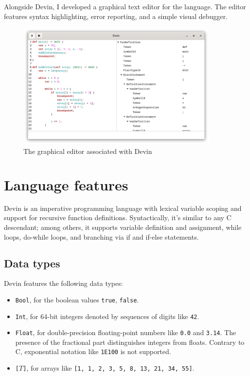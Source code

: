 \documentclass[UdineBachThesis,american,11pt]{PhdThesis}
\begin{document}
  Alongside Devin, I developed a graphical text editor for the language. The
  editor features syntax highlighting, error reporting, and a simple visual
  debugger.

  \begin{figure}[H]
    \centering
    \includegraphics[width=0.9\textwidth]{2.png}
    \caption{The graphical editor associated with Devin}
  \end{figure}

  \newpage

  \section{Language features}

  Devin is an imperative programming language with lexical variable scoping and
  support for recursive function definitions. Syntactically, it's similar to any
  C descendant; among others, it supports variable definition and assignment,
  while loops, do-while loops, and branching via if and if-else statements.

  \subsection{Data types}

  Devin features the following data types:

  \begin{itemize}
    \item \mbox{\texttt{Bool}}, for the boolean values \mbox{\texttt{true}},
    \mbox{\texttt{false}}.

    \item \mbox{\texttt{Int}}, for 64-bit integers denoted by sequences of
    digits like \mbox{\texttt{42}}.

    \item \mbox{\texttt{Float}}, for double-precision floating-point numbers
    like \mbox{\texttt{0.0}} and \mbox{\texttt{3.14}}. The presence of the
    fractional part distinguishes integers from floats. Contrary to C,
    exponential notation like \mbox{\texttt{1E100}} is not supported.

    \item \mbox{\texttt{[$T$]}}, for arrays like
    \mbox{\texttt{[1, 1, 2, 3, 5, 8, 13, 21, 34, 55]}}.
  \end{itemize}
\end{document}
